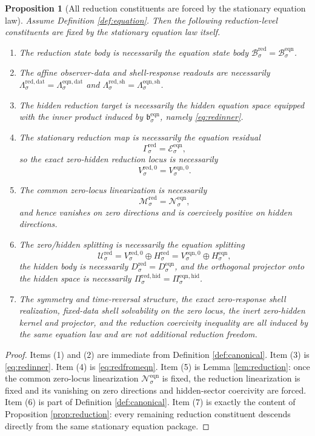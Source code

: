 \documentclass[11pt]{article}
\newcommand{\RedSpace}[1]{\mathcal U_{#1}^{\mathrm{red}}}
\newcommand{\RedBody}[1]{\mathcal B_{#1}^{\mathrm{red}}}
\newcommand{\RedData}[1]{\Lambda_{#1}^{\mathrm{red,dat}}}
\newcommand{\RedShell}[1]{\Lambda_{#1}^{\mathrm{red,sh}}}
\newcommand{\RedMap}[1]{\Gamma_{#1}^{\mathrm{red}}}
\newcommand{\RedZero}[1]{V_{#1}^{\mathrm{red},0}}
\newcommand{\RedHidden}[1]{H_{#1}^{\mathrm{red}}}
\newcommand{\RedHiddenBody}[1]{D_{#1}^{\mathrm{red}}}
\newcommand{\RedProj}[1]{\Pi_{#1}^{\mathrm{red,hid}}}
\newcommand{\RedLin}[1]{\mathcal M_{#1}^{\mathrm{red}}}
\newcommand{\EqnBody}[1]{\mathcal B_{#1}^{\mathrm{eqn}}}
\newcommand{\EqnData}[1]{\Lambda_{#1}^{\mathrm{eqn,dat}}}
\newcommand{\EqnShell}[1]{\Lambda_{#1}^{\mathrm{eqn,sh}}}
\newcommand{\EqnPair}[1]{\mathfrak b_{#1}^{\mathrm{eqn}}}
\newcommand{\EqnResidual}[1]{\mathcal E_{#1}^{\mathrm{eqn}}}
\newcommand{\EqnZero}[1]{V_{#1}^{\mathrm{eqn},0}}
\newcommand{\EqnHidden}[1]{H_{#1}^{\mathrm{eqn}}}
\newcommand{\EqnHiddenBody}[1]{D_{#1}^{\mathrm{eqn}}}
\newcommand{\EqnProj}[1]{\Pi_{#1}^{\mathrm{eqn,hid}}}
\newcommand{\EqnLin}[1]{\mathcal N_{#1}^{\mathrm{eqn}}}
\newtheorem{proposition}{Proposition}
\begin{document}
\begin{proposition}[All reduction constituents are forced by the stationary equation law]
\label{prop:forced}
Assume Definition \ref{def:equation}. Then the following reduction-level constituents are fixed by the stationary equation law itself.
\begin{enumerate}
    \item The reduction state body is necessarily the equation state body \(\RedBody{\sigma}=\EqnBody{\sigma}\).
    \item The affine observer-data and shell-response readouts are necessarily \(\RedData{\sigma}=\EqnData{\sigma}\) and \(\RedShell{\sigma}=\EqnShell{\sigma}\).
    \item The hidden reduction target is necessarily the hidden equation space equipped with the inner product induced by \(\EqnPair{\sigma}\), namely \eqref{eq:redinner}.
    \item The stationary reduction map is necessarily the equation residual
    \[
    \RedMap{\sigma}=\EqnResidual{\sigma},
    \]
    so the exact zero-hidden reduction locus is necessarily
    \[
    \RedZero{\sigma}=\EqnZero{\sigma}.
    \]
    \item The common zero-locus linearization is necessarily
    \[
    \RedLin{\sigma}=\EqnLin{\sigma},
    \]
    and hence vanishes on zero directions and is coercively positive on hidden directions.
    \item The zero/hidden splitting is necessarily the equation splitting
    \[
    \RedSpace{\sigma}
    =
    \RedZero{\sigma}\oplus\RedHidden{\sigma}
    =
    \EqnZero{\sigma}\oplus\EqnHidden{\sigma},
    \]
    the hidden body is necessarily \(\RedHiddenBody{\sigma}=\EqnHiddenBody{\sigma}\), and the orthogonal projector onto the hidden space is necessarily \(\RedProj{\sigma}=\EqnProj{\sigma}\).
    \item The symmetry and time-reversal structure, the exact zero-response shell realization, fixed-data shell solvability on the zero locus, the inert zero-hidden kernel and projector, and the reduction coercivity inequality are all induced by the same equation law and are not additional reduction freedom.
\end{enumerate}
\end{proposition}

\begin{proof}
Items (1) and (2) are immediate from Definition \ref{def:canonical}. Item (3) is \eqref{eq:redinner}. Item (4) is \eqref{eq:redfromeqn}. Item (5) is Lemma \ref{lem:reduction}: once the common zero-locus linearization \(\EqnLin{\sigma}\) is fixed, the reduction linearization is fixed and its vanishing on zero directions and hidden-sector coercivity are forced. Item (6) is part of Definition \ref{def:canonical}. Item (7) is exactly the content of Proposition \ref{prop:reduction}: every remaining reduction constituent descends directly from the same stationary equation package.
\end{proof}
\end{document}
